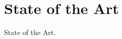 \documentclass[../Bachelorarbeit.tex]{subfiles}
\begin{document}
\chapter{State of the Art}
\label{chap:sota}

State of the Art.
\end{document}
